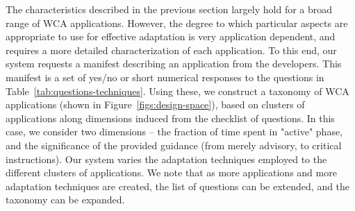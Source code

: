 The characteristics described in the previous section largely hold for
a broad range of WCA applications.  However, the degree to which
particular aspects are appropriate to use for effective adaptation is
very application dependent, and requires a more detailed
characterization of each application.  To this end, our system
requests a manifest describing an application from the developers.
This manifest is a set of yes/no or short numerical responses to the
questions in Table~\ref{tab:questions-techniques}.  Using these, we
construct a taxonomy of WCA applications (shown in
Figure~\ref{figs:design-space}), based on clusters of applications along
dimensions induced from the checklist of questions.  In this case, we
consider two dimensions -- the fraction of time spent in "active"
phase, and the significance of the provided guidance (from merely
advisory, to critical instructions).  Our system varies the adaptation
techniques employed to the different clusters of applications.  We
note that as more applications and more adaptation techniques are
created, the list of questions can be extended, and the taxonomy can be
expanded.
